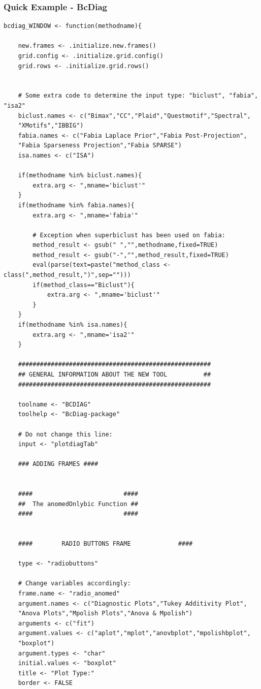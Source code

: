 \documentclass[a4paper]{article}\usepackage[]{graphicx}\usepackage[]{color}
\begin{document}
\subsubsection{Quick Example - BcDiag}
\begin{verbatim}
bcdiag_WINDOW <- function(methodname){  
	
	new.frames <- .initialize.new.frames()
	grid.config <- .initialize.grid.config()
	grid.rows <- .initialize.grid.rows()
	
	
	# Some extra code to determine the input type: "biclust", "fabia", "isa2"
	biclust.names <- c("Bimax","CC","Plaid","Questmotif","Spectral",
    "XMotifs","IBBIG")
	fabia.names <- c("Fabia Laplace Prior","Fabia Post-Projection",
    "Fabia Sparseness Projection","Fabia SPARSE")
	isa.names <- c("ISA")
	
	if(methodname %in% biclust.names){
		extra.arg <- ",mname='biclust'"
	}
	if(methodname %in% fabia.names){
		extra.arg <- ",mname='fabia'"

		# Exception when superbiclust has been used on fabia:
		method_result <- gsub(" ","",methodname,fixed=TRUE)
		method_result <- gsub("-","",method_result,fixed=TRUE)
		eval(parse(text=paste("method_class <- class(",method_result,")",sep="")))
		if(method_class=="Biclust"){
			extra.arg <- ",mname='biclust'"
		}
	}
	if(methodname %in% isa.names){
		extra.arg <- ",mname='isa2'"
	}
		
	#####################################################
	## GENERAL INFORMATION ABOUT THE NEW TOOL          ##
	#####################################################
		
	toolname <- "BCDIAG"
	toolhelp <- "BcDiag-package"	
	
	# Do not change this line:
	input <- "plotdiagTab"

	### ADDING FRAMES ####
	
		
	####                         ####
	##	The anomedOnlybic Function ##
	####                         ####
	
	
	####		RADIO BUTTONS FRAME  			####
	
	type <- "radiobuttons"
	
	# Change variables accordingly:
	frame.name <- "radio_anomed"
	argument.names <- c("Diagnostic Plots","Tukey Additivity Plot",
    "Anova Plots","Mpolish Plots","Anova & Mpolish")  
	arguments <- c("fit")		
	argument.values <- c("aplot","mplot","anovbplot","mpolishbplot",
    "boxplot") 
	argument.types <- "char"
	initial.values <- "boxplot" 
	title <- "Plot Type:"
	border <- FALSE
	

\end{verbatim}
\end{document}
